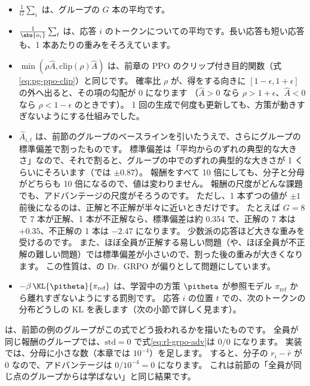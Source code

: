 \begin{itemize}
\item $\frac{1}{G}\sum_i$ は、グループの $G$ 本の平均です。
\item $\frac{1}{\abs{o_i}}\sum_t$ は、応答 $i$ のトークンについての平均です。長い応答も短い応答も、1 本あたりの重みをそろえています。
\item $\min(\rho\hat A,\mathrm{clip}(\rho)\hat A)$ は、前章の PPO のクリップ付き目的関数（式\eqref{eq:pg-ppo-clip}）と同じです。
確率比 $\rho$ が、得をする向きに $[1-\epsilon,1+\epsilon]$ の外へ出ると、その項の勾配が 0 になります
（$\hat A>0$ なら $\rho>1+\epsilon$、$\hat A<0$ なら $\rho<1-\epsilon$ のときです）。
1 回の生成で何度も更新しても、方策が動きすぎないようにする仕組みでした。
\item $\hat A_{i,t}$ は、前節のグループのベースラインを引いたうえで、さらにグループの標準偏差で割ったものです。
標準偏差は「平均からのずれの典型的な大きさ」なので、それで割ると、グループの中でのずれの典型的な大きさが 1 くらいにそろいます（では $\pm0.87$）。
報酬をすべて 10 倍にしても、分子と分母がどちらも 10 倍になるので、値は変わりません。
報酬の尺度がどんな課題でも、アドバンテージの尺度がそろうのです。
ただし、1 本ずつの値が $\pm1$ 前後になるのは、正解と不正解が半々に近いときだけです。
たとえば $G=8$ で 7 本が正解、1 本が不正解なら、標準偏差は約 0.354 で、正解の 7 本は $+0.35$、不正解の 1 本は $-2.47$ になります。
少数派の応答ほど大きな重みを受けるのです。
また、ほぼ全員が正解する易しい問題（や、ほぼ全員が不正解の難しい問題）では標準偏差が小さいので、割った後の重みが大きくなります。
この性質は、の Dr.\ GRPO が偏りとして問題にしています。
\item $-\beta\,\KL{\pitheta}{\pi_{\text{ref}}}$ は、学習中の方策 $\pitheta$ が参照モデル $\pi_{\text{ref}}$ から離れすぎないようにする罰則です。
応答 $i$ の位置 $t$ での、次のトークンの分布どうしの KL を表します（次の小節で詳しく見ます）。
\end{itemize}

は、前節の例のグループがこの式でどう扱われるかを描いたものです。
全員が同じ報酬のグループでは、$\mathrm{std}=0$ で式\eqref{eq:rl-grpo-adv}は $0/0$ になります。
実装では、分母に小さな数（本章では $10^{-4}$）を足します。
すると、分子の $r_i-\bar r$ が 0 なので、アドバンテージは $0/10^{-4}=0$ になります。
これは前節の「全員が同じ点のグループからは学ばない」と同じ結果です。

